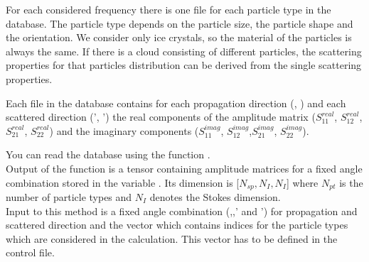 For each considered frequency there is one file for each particle
type in the database. The particle
type depends on the particle size, the particle shape and the
orientation. We consider only ice crystals, so the material of the
particles is always the same. If there is a cloud consisting of
different particles, the scattering properties for that particles
distribution can be derived from the single scattering properties.

Each file in the database contains for each propagation direction (\ScaZa,
\ScaAa) and each scattered direction (\ScaZa', \ScaAa') the real
components of the amplitude matrix ($S^{real}_{11}$, $S^{real}_{12}$,
$S^{real}_{21}$, $S^{real}_{22}$) and the imaginary components
($S^{imag}_{11}$, $S^{imag}_{12}$,$S^{imag}_{21}$, $S^{imag}_{22}$).

You can read the database using the function
.\\
Output of the function is a tensor containing amplitude matrices for
a fixed angle combination stored in the variable
. Its dimension is [$N_{sp}, N_{I}, N_{I}$]
where $N_{pt}$ is the number of particle
types  and $N_{I}$ denotes the Stokes dimension.\\
Input to this method is a fixed angle
combination  (,,' and
') for propagation and scattered direction and the vector
 which contains indices for the  particle types
which are considered in the calculation. This vector has to be defined
in the control file.


\label{sec:scattering:gen_ext}

\label{sec:scattering:gen_ext}

\label{sec:scattering:ext_mat_agenda}

